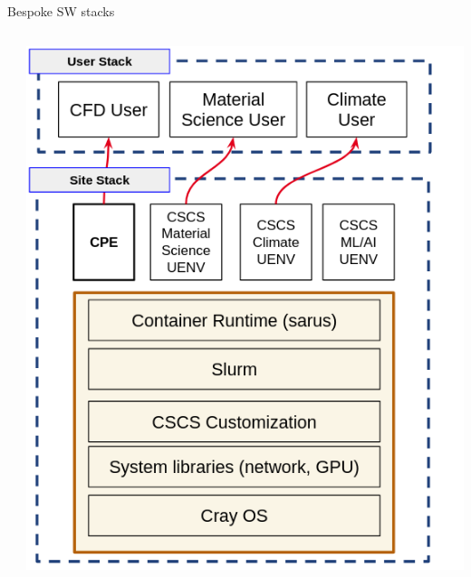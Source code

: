 \documentclass[aspectratio=43]{beamer}
\begin{document}
\begin{frame}[fragile]{Bespoke SW stacks}
\begin{columns}[T]
\begin{column}{0.6\textwidth}
        \end{column}
        \begin{column}{0.5\textwidth}
            \includegraphics[width=\textwidth]{images/stack-new.png}
        \end{column}
    \end{columns}
\end{frame}
\end{document}
